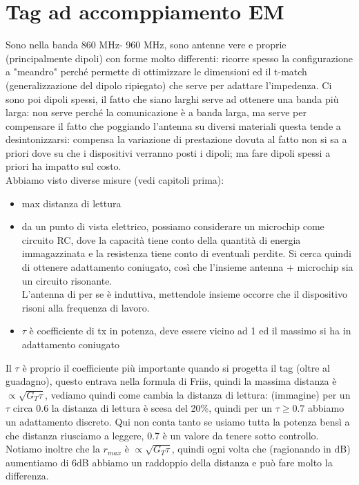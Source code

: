 \documentclass[oneside, 12pt]{extbook}
\begin{document}
\section{Tag ad accomppiamento EM}
Sono nella banda 860 MHz- 960 MHz, sono antenne vere e proprie (principalmente dipoli) con forme molto differenti: ricorre spesso la configurazione a "meandro" perché permette di ottimizzare le dimensioni ed il t-match (generalizzazione del dipolo ripiegato) che serve per adattare l'impedenza. Ci sono poi dipoli spessi, il fatto che siano larghi serve ad ottenere una banda più larga: non serve perché la comunicazione è a banda larga, ma serve per compensare il fatto che poggiando l'antenna su diversi materiali questa tende a desintonizzarsi: compensa la variazione di prestazione dovuta al fatto non si sa a priori dove su che i dispositivi verranno posti i dipoli; ma fare dipoli spessi a priori ha impatto sul costo.\\Abbiamo visto diverse misure (vedi capitoli prima):
\begin{itemize}
	\item max distanza di lettura
	\item da un punto di vista elettrico, possiamo considerare un microchip come circuito RC, dove la capacità tiene conto della quantità di energia immagazzinata e la resistenza tiene conto di eventuali perdite. Si cerca quindi di ottenere adattamento coniugato, così che l'insieme antenna + microchip sia un circuito risonante.\\L'antenna di per se è induttiva, mettendole insieme occorre che il dispositivo risoni alla frequenza di lavoro.
	\item $\tau$ è coefficiente di tx in potenza, deve essere vicino ad 1 ed il massimo si ha in adattamento coniugato
\end{itemize}
Il $\tau$ è proprio il coefficiente più importante quando si progetta il tag (oltre al guadagno), questo entrava nella formula di Friis, quindi la massima distanza è $\propto \sqrt{G_T \tau}$, vediamo quindi come cambia la distanza di lettura: (immagine)
per un $\tau$ circa 0.6 la distanza di lettura è scesa del 20\%, quindi per un $\tau \geq 0.7$ abbiamo un adattamento discreto. Qui non conta tanto se usiamo tutta la potenza bensì a che distanza riusciamo a leggere, 0.7 è un valore da tenere sotto controllo.\\Notiamo inoltre che la $r_{max}$ è $\propto \sqrt{G_T \tau}$, quindi ogni volta che (ragionando in dB) aumentiamo di 6dB abbiamo un raddoppio della distanza e può fare molto la differenza.
\end{document}
